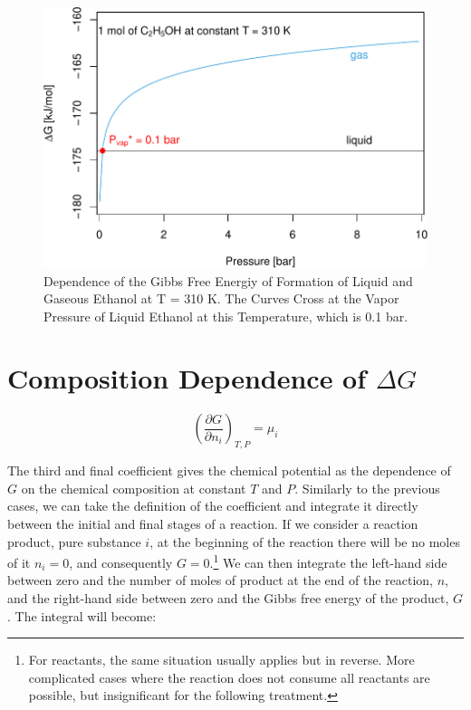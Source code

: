 \documentclass[
  9pt,
]{extbook}
\theoremstyle{definition}
\theoremstyle{definition}
\theoremstyle{definition}
\theoremstyle{remark}
\begin{document}
\begin{figure}

{\centering \includegraphics{pchem1_files/figure-latex/gdeppfig-1} 

}

\caption{Dependence of the Gibbs Free Energiy of Formation of Liquid and Gaseous Ethanol at T = 310 K. The Curves Cross at the Vapor Pressure of Liquid Ethanol at this Temperature, which is 0.1 bar.}\label{fig:gdeppfig}
\end{figure}

\hypertarget{composition-dependence-of-delta-g}{%
\section{\texorpdfstring{Composition Dependence of \(\Delta G\)}{Composition Dependence of \textbackslash Delta G}}\label{composition-dependence-of-delta-g}}

\[
\left(\frac{\partial G}{\partial n_i} \right)_{T,P}=\mu_i
\]

The third and final coefficient gives the chemical potential as the dependence of \(G\) on the chemical composition at constant \(T\) and \(P\). Similarly to the previous cases, we can take the definition of the coefficient and integrate it directly between the initial and final stages of a reaction. If we consider a reaction product, pure substance \(i\), at the beginning of the reaction there will be no moles of it \(n_i=0\), and consequently \(G=0\).\footnote{For reactants, the same situation usually applies but in reverse. More complicated cases where the reaction does not consume all reactants are possible, but insignificant for the following treatment.} We can then integrate the left-hand side between zero and the number of moles of product at the end of the reaction, \(n\), and the right-hand side between zero and the Gibbs free energy of the product, \(G\). The integral will become:
\end{document}
